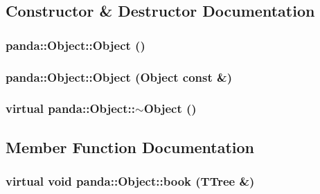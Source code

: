 \subsection{Constructor \& Destructor Documentation}
\hypertarget{classpanda_1_1Object_aaa29338b8f6013a1b2cc9899c10bf5d1}{
\subsubsection[{Object}]{\setlength{\rightskip}{0pt plus 5cm}panda::Object::Object ()}}
\label{classpanda_1_1Object_aaa29338b8f6013a1b2cc9899c10bf5d1}
\hypertarget{classpanda_1_1Object_a2cb7b48f10893ce4b2122bfcc77b4858}{
\subsubsection[{Object}]{\setlength{\rightskip}{0pt plus 5cm}panda::Object::Object ({\bf Object} const \&)}}
\label{classpanda_1_1Object_a2cb7b48f10893ce4b2122bfcc77b4858}
\hypertarget{classpanda_1_1Object_a447fe991d26f3b37f271c2ed7860b564}{
\subsubsection[{$\sim$Object}]{\setlength{\rightskip}{0pt plus 5cm}virtual panda::Object::$\sim$Object ()}}
\label{classpanda_1_1Object_a447fe991d26f3b37f271c2ed7860b564}


\subsection{Member Function Documentation}
\hypertarget{classpanda_1_1Object_a2fcd6665633deef16e86aa4e49135dd7}{
\subsubsection[{book}]{\setlength{\rightskip}{0pt plus 5cm}virtual void panda::Object::book (TTree \&)}}
\label{classpanda_1_1Object_a2fcd6665633deef16e86aa4e49135dd7}


